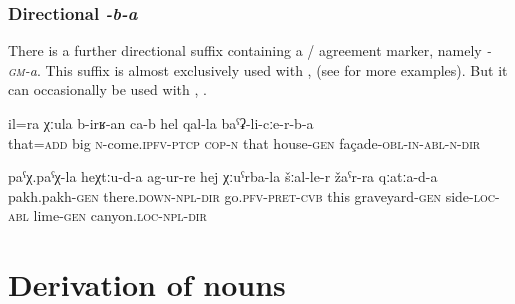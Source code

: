 
\subsubsection{Directional \textit{-b-a}}
\label{sssec:Directional -gm-a}

There is a further directional suffix containing a / agreement marker, namely \textit{-\textsc{gm}-a}. This suffix is almost exclusively used with  ,  (see  for more examples). But it can occasionally be used with  , .
%
\begin{exe}
	\ex	\label{This is also growing along the façade of the house}
	\gll	il=ra	χːula	b-irʁ-an ca-b	hel	qal-la	baˁʡ-li-cːe-r-b-a\\
		that=\textsc{add}	big	\textsc{n}-come.\textsc{ipfv}-\textsc{ptcp} \textsc{cop-n}	that	house-\textsc{gen}	façade-\textsc{obl-in}-\textsc{abl}-\textsc{n}-\textsc{dir}\\
	\glt	{}
	
	\ex	\label{They went in the direction of pakh-pakh (microtoponym), across the side of the graveyard,}
	\gll	paˁχ.paˁχ-la	heχtːu-d-a	ag-ur-re	hej	χːuˁrba-la	šːal-le-r žaˁr-ra	qːatːa-d-a \\
		pakh.pakh-\textsc{gen}	there.\textsc{down-npl}-\textsc{dir}	go.\textsc{pfv}-\textsc{pret}-\textsc{cvb}	this	graveyard-\textsc{gen}	side-\textsc{loc}-\textsc{abl}	lime-\textsc{gen}	canyon.\textsc{loc}-\textsc{npl}-\textsc{dir}\\
	\glt	{}
\end{exe}



\section{Derivation of nouns}
\label{sec:nounderivation}



